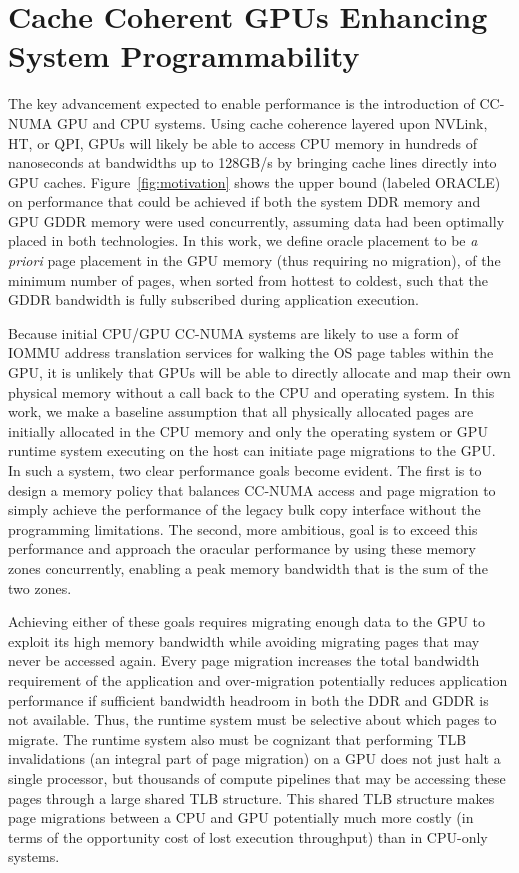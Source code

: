 \section {Cache Coherent GPUs Enhancing System Programmability}
The key advancement expected to enable performance is the introduction of
CC-NUMA GPU and CPU systems.  Using cache coherence layered upon NVLink, HT, or
QPI, GPUs will likely be able to access CPU memory in hundreds of nanoseconds at
bandwidths up to 128GB/s by bringing cache lines directly into GPU caches.
Figure~\ref{fig:motivation} shows the upper bound (labeled ORACLE) on
performance that could be achieved if both the system DDR memory and GPU GDDR
memory were used concurrently, assuming data had been optimally placed in both
technologies.  In this work, we define oracle placement to be \emph{a priori}
page placement in the GPU memory (thus requiring no migration), of the minimum
number of pages, when sorted from hottest to coldest, such that the GDDR
bandwidth is fully subscribed during application execution.

Because initial CPU/GPU CC-NUMA systems are likely to use a form of IOMMU
address translation services for walking the OS page tables within the GPU,  it
is unlikely that GPUs will be able to directly allocate and map their own
physical memory without a call back to the CPU and operating system.  In this
work, we make a baseline assumption that all physically allocated pages are
initially allocated in the CPU memory and only the operating system or GPU
runtime system executing on the host can initiate page migrations to the GPU\@.
In such a system, two clear performance goals become evident.  The first is to
design a memory policy that balances CC-NUMA access and page migration to simply
achieve the performance of the legacy bulk copy interface without the
programming limitations.  The second, more ambitious, goal is to exceed this
performance and approach the oracular performance by using these memory zones
concurrently, enabling a peak memory bandwidth that is the sum of the two zones.

Achieving either of these goals requires migrating enough data to the GPU to
exploit its high memory bandwidth while avoiding migrating pages that may never
be accessed again.  Every page migration increases the total bandwidth
requirement of the application and over-migration potentially reduces
application performance if sufficient bandwidth headroom in both the DDR and
GDDR is not available.  Thus, the runtime system must be selective about which
pages to migrate.  The runtime system also must be cognizant that performing TLB
invalidations (an integral part of page migration) on a GPU does not just halt a
single processor, but thousands of compute pipelines that may be accessing these
pages through a large shared TLB structure.  This shared TLB structure makes
page migrations between a CPU and GPU potentially much more costly (in terms of
the opportunity cost of lost execution throughput) than in CPU-only systems.

